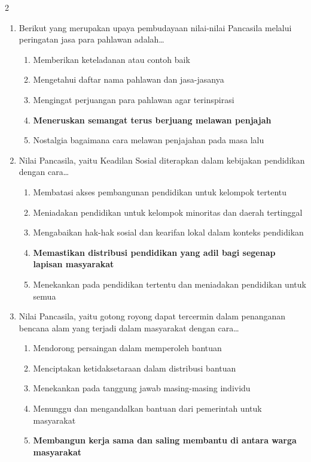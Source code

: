 \documentclass[10pt,a4paper]{article}
\begin{document}
\begin{multicols}{2}
\begin{enumerate}
  \item Berikut yang merupakan upaya pembudayaan nilai-nilai Pancasila melalui peringatan jasa para pahlawan adalah\dots
    \begin{enumerate}
    \item Memberikan keteladanan atau contoh baik
    \item Mengetahui daftar nama pahlawan dan jasa-jasanya
    \item Mengingat perjuangan para pahlawan agar terinspirasi
    \item \textbf{Meneruskan semangat terus berjuang melawan penjajah}
    \item Nostalgia bagaimana cara melawan penjajahan pada masa lalu
    \end{enumerate}

  \item Nilai Pancasila, yaitu Keadilan Sosial diterapkan dalam kebijakan pendidikan dengan cara\dots
    \begin{enumerate}
    \item Membatasi akses pembangunan pendidikan untuk kelompok tertentu
    \item Meniadakan pendidikan untuk kelompok minoritas dan daerah tertinggal
    \item Mengabaikan hak-hak sosial dan kearifan lokal dalam konteks pendidikan
    \item \textbf{Memastikan distribusi pendidikan yang adil bagi segenap lapisan masyarakat}
    \item Menekankan pada pendidikan tertentu dan meniadakan pendidikan untuk semua
    \end{enumerate}

  \item Nilai Pancasila, yaitu gotong royong dapat tercermin dalam penanganan bencana alam yang terjadi dalam masyarakat dengan cara\dots
    \begin{enumerate}
    \item Mendorong persaingan dalam memperoleh bantuan
    \item Menciptakan ketidaksetaraan dalam distribusi bantuan
    \item Menekankan pada tanggung jawab masing-masing individu
    \item Menunggu dan mengandalkan bantuan dari pemerintah untuk masyarakat
    \item \textbf{Membangun kerja sama dan saling membantu di antara warga masyarakat}
    \end{enumerate}


\end{enumerate}
\end{multicols}
\end{document}
